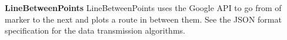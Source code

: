 \documentclass{project}
\begin{document}
\textbf{LineBetweenPoints}
LineBetweenPoints uses the Google API to go from of marker to the next and plots a route in between them. See the JSON format specification for the data transmission algorithms.

\end{document}
